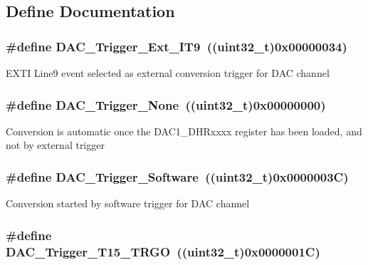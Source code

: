 \subsection{Define Documentation}
\hypertarget{group__DAC__trigger__selection_ga67c15b2c26246a2304f9db28e25adcc4}{
\subsubsection[{DAC\_\-Trigger\_\-Ext\_\-IT9}]{\setlength{\rightskip}{0pt plus 5cm}\#define DAC\_\-Trigger\_\-Ext\_\-IT9~((uint32\_\-t)0x00000034)}}
\label{group__DAC__trigger__selection_ga67c15b2c26246a2304f9db28e25adcc4}
EXTI Line9 event selected as external conversion trigger for DAC channel \hypertarget{group__DAC__trigger__selection_ga7849138e043267668d755390d923e4ba}{
\subsubsection[{DAC\_\-Trigger\_\-None}]{\setlength{\rightskip}{0pt plus 5cm}\#define DAC\_\-Trigger\_\-None~((uint32\_\-t)0x00000000)}}
\label{group__DAC__trigger__selection_ga7849138e043267668d755390d923e4ba}
Conversion is automatic once the DAC1\_\-DHRxxxx register has been loaded, and not by external trigger \hypertarget{group__DAC__trigger__selection_gadef77bb8bbd109232900902402ef637f}{
\subsubsection[{DAC\_\-Trigger\_\-Software}]{\setlength{\rightskip}{0pt plus 5cm}\#define DAC\_\-Trigger\_\-Software~((uint32\_\-t)0x0000003C)}}
\label{group__DAC__trigger__selection_gadef77bb8bbd109232900902402ef637f}
Conversion started by software trigger for DAC channel \hypertarget{group__DAC__trigger__selection_ga9f738c0c1366a588ac4fa9e060278c70}{
\subsubsection[{DAC\_\-Trigger\_\-T15\_\-TRGO}]{\setlength{\rightskip}{0pt plus 5cm}\#define DAC\_\-Trigger\_\-T15\_\-TRGO~((uint32\_\-t)0x0000001C)}}
